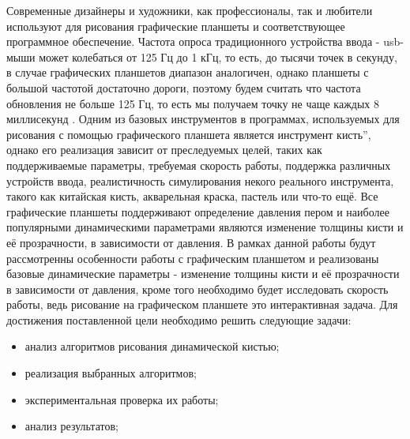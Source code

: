 \Introduction


Современные дизайнеры и художники, как профессионалы, так и любители используют для рисования графические планшеты и соответствующее программное обеспечение. Частота опроса традиционного устройства ввода - usb-мыши может колебаться от 125 Гц до 1 кГц, то есть, до тысячи точек в секунду, в случае графических планшетов диапазон аналогичен, однако планшеты с большой частотой достаточно дороги, поэтому будем считать что частота обновления не больше 125 Гц, то есть мы получаем точку не чаще каждых 8 миллисекунд \cite{ps2}. Одним из базовых инструментов в программах, используемых для рисования с помощью графического планшета является инструмент  кисть\textquotedblright , однако его реализация зависит от преследуемых целей, таких как поддерживаемые параметры, требуемая скорость работы, поддержка различных устройств ввода, реалистичность симулирования некого реального инструмента, такого как китайская кисть, акварельная краска, пастель или что-то ещё. Все графические планшеты поддерживают определение давления пером и наиболее популярными динамическими параметрами являются изменение толщины кисти и её прозрачности, в зависимости от давления. В рамках данной работы будут рассмотренны особенности работы с графическим планшетом и реализованы базовые динамические параметры - изменение толщины кисти и её прозрачности в зависимости от давления, кроме того необходимо будет исследовать скорость работы, ведь рисование на графическом планшете это интерактивная задача.
Для достижения поставленной цели необходимо решить следующие задачи:

\begin{itemize}
\item анализ алгоритмов рисования динамической кистью;
\item реализация выбранных алгоритмов;
\item экспериментальная проверка их работы;
\item анализ результатов;

\end{itemize}

